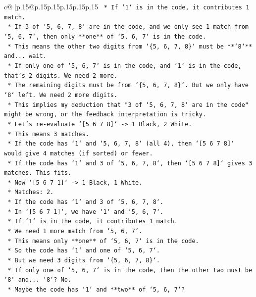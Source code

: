 \documentclass{article}
\begin{document}
{\begin{supertabular}{c@{$\;$}|p{.15\linewidth}@{}p{.15\linewidth}p{.15\linewidth}p{.15\linewidth}p{.15\linewidth}p{.15\linewidth}}
{{{\texttt{    *   If `1` is in the code, it contributes 1 match.} \\
\texttt{    *   If 3 of `5, 6, 7, 8` are in the code, and we only see 1 match from `5, 6, 7`, then only **one** of `5, 6, 7` is in the code.} \\
\texttt{    *   This means the other two digits from `\{5, 6, 7, 8\}` must be **`8`** and... wait.} \\
\texttt{    *   If only one of `5, 6, 7` is in the code, and `1` is in the code, that's 2 digits. We need 2 more.} \\
\texttt{    *   The remaining digits must be from `\{5, 6, 7, 8\}`. But we only have `8` left. We need 2 more digits.} \\
\texttt{    *   This implies my deduction that "3 of `5, 6, 7, 8` are in the code" might be wrong, or the feedback interpretation is tricky.} \\
\texttt{    *   Let's re{-}evaluate `{[}5 6 7 8{]}` {-}> 1 Black, 2 White.} \\
\texttt{        *   This means 3 matches.} \\
\texttt{        *   If the code has `1` and `5, 6, 7, 8` (all 4), then `{[}5 6 7 8{]}` would give 4 matches (if sorted) or fewer.} \\
\texttt{        *   If the code has `1` and 3 of `5, 6, 7, 8`, then `{[}5 6 7 8{]}` gives 3 matches. This fits.} \\
\texttt{    *   Now `{[}5 6 7 1{]}` {-}> 1 Black, 1 White.} \\
\texttt{        *   Matches: 2.} \\
\texttt{        *   If the code has `1` and 3 of `5, 6, 7, 8`.} \\
\texttt{        *   In `{[}5 6 7 1{]}`, we have `1` and `5, 6, 7`.} \\
\texttt{        *   If `1` is in the code, it contributes 1 match.} \\
\texttt{        *   We need 1 more match from `5, 6, 7`.} \\
\texttt{        *   This means only **one** of `5, 6, 7` is in the code.} \\
\texttt{        *   So the code has `1` and one of `5, 6, 7`.} \\
\texttt{        *   But we need 3 digits from `\{5, 6, 7, 8\}`.} \\
\texttt{        *   If only one of `5, 6, 7` is in the code, then the other two must be `8` and... `8`? No.} \\
\texttt{        *   Maybe the code has `1` and **two** of `5, 6, 7`?} \\
}}}
\end{supertabular}}
\end{document}
